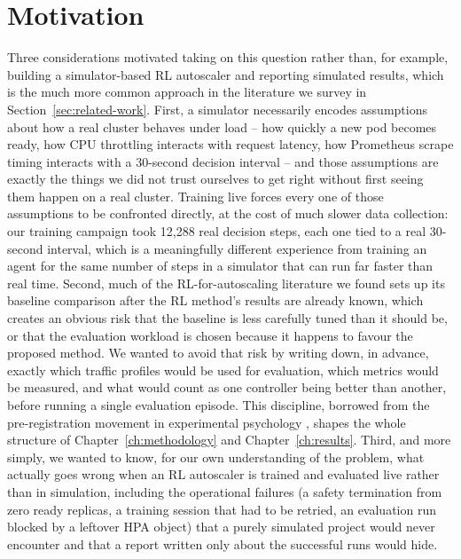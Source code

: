 \section{Motivation}
\label{sec:intro-motivation}

Three considerations motivated taking on this question rather than, for
example, building a simulator-based RL autoscaler and reporting simulated
results, which is the much more common approach in the literature we survey
in Section~\ref{sec:related-work}. First, a simulator necessarily encodes
assumptions about how a real cluster behaves under load -- how quickly a new
pod becomes ready, how CPU throttling interacts with request latency, how
Prometheus scrape timing interacts with a 30-second decision interval -- and
those assumptions are exactly the things we did not trust ourselves to get
right without first seeing them happen on a real cluster. Training live
forces every one of those assumptions to be confronted directly, at the
cost of much slower data collection: our training campaign took 12,288 real
decision steps, each one tied to a real 30-second interval, which is a
meaningfully different experience from training an agent for the same
number of steps in a simulator that can run far faster than real time.
Second, much of the RL-for-autoscaling literature we found sets up its
baseline comparison after the RL method's results are already known, which
creates an obvious risk that the baseline is less carefully tuned than it
should be, or that the evaluation workload is chosen because it happens to
favour the proposed method. We wanted to avoid that risk by writing down, in
advance, exactly which traffic profiles would be used for evaluation, which
metrics would be measured, and what would count as one controller being
better than another, before running a single evaluation episode. This
discipline, borrowed from the pre-registration movement in experimental
psychology \cite{nosek2018preregistration}, shapes the whole structure of
Chapter~\ref{ch:methodology} and Chapter~\ref{ch:results}. Third, and more
simply, we wanted to know, for our own understanding of the problem, what
actually goes wrong when an RL autoscaler is trained and evaluated live
rather than in simulation, including the operational failures (a safety
termination from zero ready replicas, a training session that had to be
retried, an evaluation run blocked by a leftover HPA object) that a purely
simulated project would never encounter and that a report written only
about the successful runs would hide.

